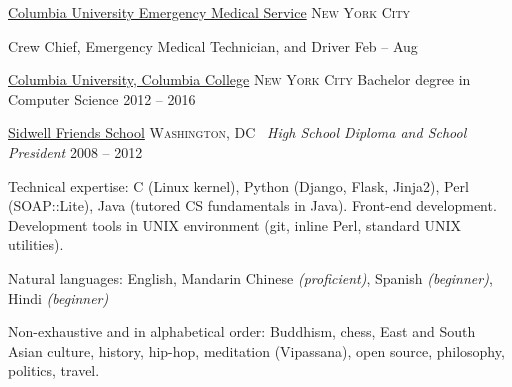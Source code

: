 \documentclass[10pt,a4paper]{article}
\begin{document}

\headedsection
  {\href{http://cuems.columbia.edu/}{Columbia University Emergency Medical
Service}}
  {\textsc{New York City}} {%

  \headedsubsection
    {Crew Chief, Emergency Medical Technician, and Driver}
    {Feb  -- Aug }
    {}


}

\spacedhrule{-0.2em}{-0.4em}


\headedsection
  {\href{columbia.edu}{Columbia University, Columbia College}}
  {\textsc{New York City}} {%
  \headedsubsection
    {Bachelor degree in Computer Science}
    {2012 -- 2016}
    {}
}

\headedsection
  {\href{sidwell.edu}{Sidwell Friends School}}
  {\textsc{Washington, DC}} {%
  \headedsubsection
    { \textnormal{\textit{~High School Diploma and School President}}}
    {2008 -- 2012} {}
}



\spacedhrule{0.5em}{-0.4em}


\inlineheadsection  %
  {Technical expertise:}
  {C (Linux kernel), Python (Django, Flask, Jinja2), Perl (SOAP::Lite), Java
(tutored CS fundamentals in Java). Front-end development. Development tools in
UNIX environment (git, inline Perl, standard UNIX utilities).}

\vspace{0.5em}
\inlineheadsection
  {Natural languages:}
  {English, Mandarin Chinese \emph{(proficient)}, Spanish \emph{(beginner)},
Hindi \emph{(beginner)}}


\spacedhrule{1.6em}{-0.4em}


\inlineheadsection
  {Non-exhaustive and in alphabetical order:}
  {Buddhism, chess, East and South Asian culture, history, hip-hop, meditation
(Vipassana), open source, philosophy, politics, travel.}
\vspace{1.6em}

\textcolor{gray}{}
\end{document}
